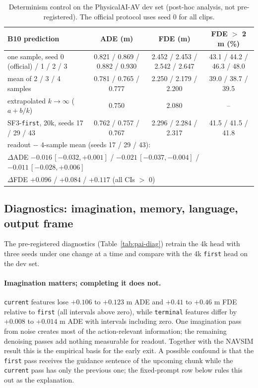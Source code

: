 \documentclass[10pt]{article}
\newcommand{\first}{\texttt{first}}
\newcommand{\current}{\texttt{current}}
\newcommand{\terminal}{\texttt{terminal}}
\begin{document}
\begin{table}[t]
\caption{Determinism control on the PhysicalAI-AV dev set (post-hoc analysis, not pre-registered). The official protocol uses seed 0 for all clips.}
\label{tab:determinism}
\begin{center}
\footnotesize
\setlength{\tabcolsep}{2pt}
\begin{tabular}{lccc}
\toprule
B10 prediction & ADE (m) & FDE (m) & FDE $>$ 2 m (\%) \\
\midrule
one sample, seed 0 (official) / 1 / 2 / 3 & 0.821 / 0.869 / 0.882 / 0.930 & 2.452 / 2.453 / 2.542 / 2.647 & 43.1 / 44.2 / 46.3 / 48.0 \\
mean of 2 / 3 / 4 samples & 0.781 / 0.765 / 0.777 & 2.250 / 2.179 / 2.200 & 39.0 / 38.7 / 39.5 \\
extrapolated $k \to \infty$ ($a + b/k$) & 0.750 & 2.080 & -- \\
\midrule
SF3-\first{}, 20k, seeds 17 / 29 / 43 & 0.762 / 0.757 / 0.767 & 2.296 / 2.284 / 2.317 & 41.5 / 41.5 / 41.8 \\
\multicolumn{4}{l}{readout $-$ 4-sample mean (seeds 17 / 29 / 43):} \\
\multicolumn{4}{l}{\quad $\Delta$ADE $-0.016\,[-0.032,+0.001]$ / $-0.021\,[-0.037,-0.004]$ / $-0.011\,[-0.028,+0.006]$} \\
\multicolumn{4}{l}{\quad $\Delta$FDE $+0.096$ / $+0.084$ / $+0.117$ (all CIs $>$ 0)} \\
\bottomrule
\end{tabular}
\end{center}
\end{table}

\subsection{Diagnostics: imagination, memory, language, output frame}
\label{sec:pai-diag}

The pre-registered diagnostics (Table~\ref{tab:pai-diag}) retrain the 4k head with three seeds under one change at a time and compare with the 4k \first{} head on the dev set.

\paragraph{Imagination matters; completing it does not.} \current{} features lose $+0.106$ to $+0.123$ m ADE and $+0.41$ to $+0.46$ m FDE relative to \first{} (all intervals above zero), while \terminal{} features differ by $+0.008$ to $+0.014$ m ADE with intervals including zero. One imagination pass from noise creates most of the action-relevant information; the remaining denoising passes add nothing measurable for readout. Together with the NAVSIM result this is the empirical basis for the early exit. A possible confound is that the \first{} pass receives the guidance sentence of the upcoming chunk while the \current{} pass has only the previous one; the fixed-prompt row below rules this out as the explanation.
\end{document}
